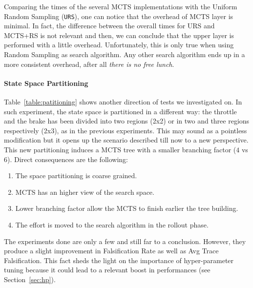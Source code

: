 \documentclass[11pt]{article}
\begin{document}
Comparing the times of the several MCTS implementations with the Uniform Random Sampling (\texttt{URS}), one can notice that the overhead of MCTS layer is minimal. In fact, the difference between the overall times for URS and MCTS+RS is not relevant and then, we can conclude that the upper layer is performed with a little overhead. 
Unfortunately, this is only true when using Random Sampling as search algorithm. Any other search algorithm ends up in a more consistent overhead, after all \textit{there is no free lunch}. 

\paragraph{State Space Partitioning}
Table~\ref{table:patitioning} shows another direction of tests we investigated on. In such experiment, the state space is partitioned in a different way: the throttle and the brake has been divided into two regions (2x2) or in two and three regions respectively (2x3), as in the previous experiments.
This may sound as a pointless modification but it opens up the scenario described till now to a new perspective.
This new partitioning induces a MCTS tree with a smaller branching factor ($4$ vs $6$). Direct consequences are the following:
\begin{enumerate}
    \item The space partitioning is coarse grained.
    \item MCTS has an higher view of the search space.
    \item Lower branching factor allow the MCTS to finish earlier the tree building.
    \item The effort is moved to the search algorithm in the rollout phase.
\end{enumerate}

The experiments done are only a few and still far to a conclusion. However, they produce a slight improvement in Falsification Rate as well as Avg Trace Falsification. This fact sheds the light on the importance of hyper-parameter tuning because it could lead to a relevant boost in performances (see Section~\ref{sec:hp}).

\end{document}
